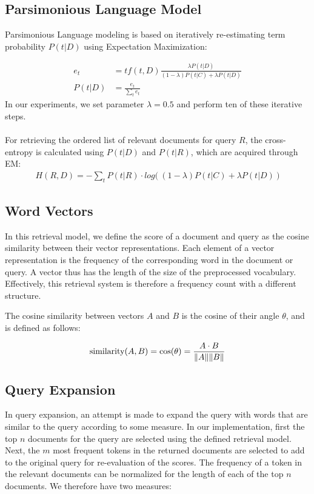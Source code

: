\documentclass{article}
\begin{document}
\subsection*{Parsimonious Language Model}

Parsimonious Language modeling is based on iteratively re-estimating term probability $P(t|D)$ using Expectation Maximization:

\begin{align*}
e_t &= tf(t,D)\frac{\lambda P(t|D)}{(1-\lambda)P(t|C)+\lambda P(t|D)} \\
P(t|D) &= \frac{e_t}{\sum_t e_t}
\end{align*}
In our experiments, we set parameter $\lambda = 0.5$ and perform ten of these iterative steps.\\ \\
For retrieving the ordered list of relevant documents for query $R$, the cross-entropy is calculated using $P(t|D)$ and $P(t|R)$, which are acquired through EM:
\begin{align*}
H(R,D) = -\sum_t P(t|R)\cdot log\big( \ (1-\lambda)P(t|C)+\lambda P(t|D) \ \big)
\end{align*}

\subsection*{Word Vectors}

In this retrieval model, we define the score of a document and query as the cosine similarity between their vector representations. Each element of a vector representation is the frequency of the corresponding word in the document or query. A vector thus has the length of the size of the preprocessed vocabulary. Effectively, this retrieval system is therefore a frequency count with a different structure.

The cosine similarity between vectors $A$ and $B$ is the cosine of their angle $\theta$, and is defined as follows:

\begin{align*}
\text{similarity}(A,B) = \cos(\theta) = {A \cdot B \over \|A\| \|B\|} 
\end{align*}


\subsection*{Query Expansion}
In query expansion, an attempt is made to expand the query with words that are similar to the query according to some measure. In our implementation, first the top $n$ documents for the query are selected using the defined retrieval model. Next, the $m$ most frequent tokens in the returned documents are selected to add to the original query for re-evaluation of the scores. The frequency of a token in the relevant documents can be normalized for the length of each of the top $n$ documents. We therefore have two measures:
\end{document}
